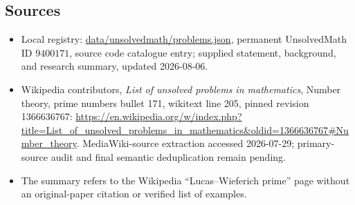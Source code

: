 \documentclass[11pt]{article}
\begin{document}
\subsection{Sources}
\begin{itemize}
\item Local registry: \url{data/unsolvedmath/problems.json}, permanent UnsolvedMath ID \(9400171\), source code catalogue entry; supplied statement, background, and research summary, updated 2026-08-06.
\item Wikipedia contributors, \emph{List of unsolved problems in mathematics}, Number theory, prime numbers bullet 171, wikitext line 205, pinned revision 1366636767: \url{https://en.wikipedia.org/w/index.php?title=List_of_unsolved_problems_in_mathematics&oldid=1366636767#Number_theory}. MediaWiki-source extraction accessed 2026-07-29; primary-source audit and final semantic deduplication remain pending.
\item The summary refers to the Wikipedia ``Lucas--Wieferich prime'' page without an original-paper citation or verified list of examples.
\end{itemize}
\end{document}
